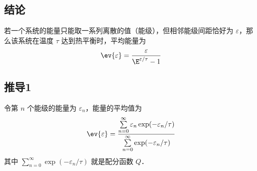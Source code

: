 
\begin{issues}
\issueDraft
\end{issues}


\subsection{结论}
若一个系统的能量只能取一系列离散的值（能级），但相邻能级间距恰好为 $\varepsilon$，那么该系统在温度 $\tau$ 达到热平衡时，平均能量为
\begin{equation}
\ev{\varepsilon} = \frac{\varepsilon}{\E^{\varepsilon/\tau} - 1}
\end{equation}

\subsection{推导1}
令第 $n$ 个能级的能量为 $\varepsilon_n$，能量的平均值为
\begin{equation}\label{EqCE_eq2}
\ev{\varepsilon} = \frac{\sum\limits_{n = 0}^\infty  \varepsilon_n \exp(-\varepsilon_n/\tau)}{\sum\limits_{n = 0}^\infty \exp(-\varepsilon_n/\tau)}
\end{equation}
其中 $\sum\limits_{n = 0}^\infty \exp(-\varepsilon_n/\tau)$ 就是配分函数 $Q$．

